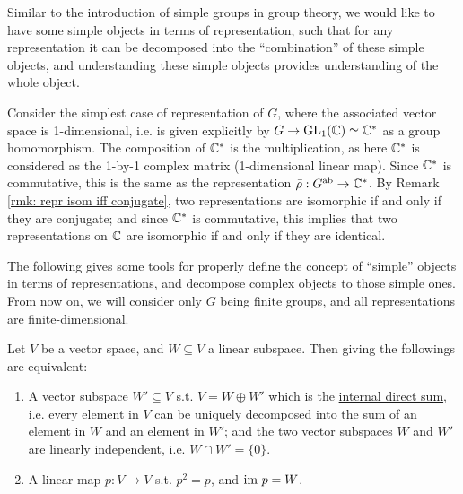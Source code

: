 \documentclass{article}
\begin{document}
\textstart
Similar to the introduction of simple groups in group theory, we would like to have some simple objects in terms of representation, such that for any representation it can be decomposed into the ``combination'' of these simple objects, and understanding these simple objects provides understanding of the whole object. 

Consider the simplest case of representation of $G$, where the associated vector space is 1-dimensional, i.e. is given explicitly by $G \to \mathrm{GL}_1(\mathbb{C}) \simeq \mathbb{C}^{\ast}$ as a group homomorphism. The composition of $\mathbb{C}^{\ast}$ is the multiplication, as here $\mathbb{C}^{\ast}$ is considered as the 1-by-1 complex matrix (1-dimensional linear map). Since $\mathbb{C}^{\ast}$ is commutative, this is the same as the representation $\bar{\rho}: G^{\mathrm{ab}} \to \mathbb{C}^{\ast}$. By Remark \ref{rmk: repr isom iff conjugate}, two representations are isomorphic if and only if they are conjugate; and since $\mathbb{C}^{\ast}$ is commutative, this implies that two representations on $\mathbb{C}$ are isomorphic if and only if they are identical.

The following gives some tools for properly define the concept of ``simple'' objects in terms of representations, and decompose complex objects to those simple ones. From now on, we will consider only $G$ being finite groups, and all representations are finite-dimensional.

\begin{parenthesis}\label{pth: equiv in v.s. for internal sum and projection}
    Let $V$ be a vector space, and $W \subseteq V$ a linear subspace. Then giving the followings are equivalent:
    \begin{enumerate}[label=\arabic*)]
        \item A vector subspace $W' \subseteq V$ s.t. $V = W \oplus W'$ which is the \underline{internal direct sum}, i.e. every element in $V$ can be uniquely decomposed into the sum of an element in $W$ and an element in $W'$; and the two vector subspaces $W$ and $W'$ are linearly independent, i.e. $W \cap W' = \{0\}$.
        \item A linear map $p: V \to V$ s.t. $p^2 = p$, and $\mathrm{im}\  p = W$.
    \end{enumerate}
\end{parenthesis}
\end{document}
